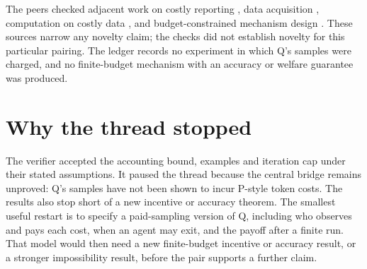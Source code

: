 \documentclass{article}
\begin{document}
The peers checked adjacent work on costly reporting \cite{osborne}, data acquisition \cite{chen},
computation on costly data \cite{delegating}, and budget-constrained mechanism design
\cite{budgetagents}. These sources narrow any novelty claim; the checks did not establish novelty
for this particular pairing. The ledger records no experiment in which Q's samples were charged, and
no finite-budget mechanism with an accuracy or welfare guarantee was produced.

\section{Why the thread stopped}

The verifier accepted the accounting bound, examples and iteration cap under their stated
assumptions. It paused the thread because the central bridge remains unproved: Q's samples have not
been shown to incur P-style token costs. The results also stop short of a new incentive or accuracy
theorem. The smallest useful restart is to specify a paid-sampling version of Q, including who
observes and pays each cost, when an agent may exit, and the payoff after a finite run. That model
would then need a new finite-budget incentive or accuracy result, or a stronger impossibility
result, before the pair supports a further claim.



\end{document}
